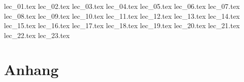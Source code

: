 \documentclass[fancyfoot, a4paper, german, lecturenumbers = true, number small environments = theorem]{mkessler-script}
\author{Maximilian Keßler}
\begin{document}
    \maketitle

    

    \cleardoublepage
    \tableofcontents

    \cleardoublepage
    \listoftodos

    \cleardoublepage
    \summaryoflectures

    \cleardoublepage
    {lec_01.tex}
    {lec_02.tex}
    {lec_03.tex}
    {lec_04.tex}
    {lec_05.tex}
    {lec_06.tex}
    {lec_07.tex}
    {lec_08.tex}
    {lec_09.tex}
    {lec_10.tex}
    {lec_11.tex}
    {lec_12.tex}
    {lec_13.tex}
    {lec_14.tex}
    {lec_15.tex}
    {lec_16.tex}
    {lec_17.tex}
    {lec_18.tex}
    {lec_19.tex}
    {lec_20.tex}
    {lec_21.tex}
    {lec_22.tex}
    {lec_23.tex}

    \cleardoublepage
    \appendix
    \part{Anhang}

    
    
    \cleardoublepage
    

    \cleardoublepage
    \printindex

    \cleardoublepage
    \printimageattributions

    \cleardoublepage
    \printliterature
\end{document}
